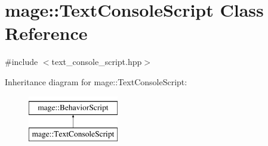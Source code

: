 \hypertarget{classmage_1_1_text_console_script}{}\section{mage\+:\+:Text\+Console\+Script Class Reference}
\label{classmage_1_1_text_console_script}


{\ttfamily \#include $<$text\+\_\+console\+\_\+script.\+hpp$>$}

Inheritance diagram for mage\+:\+:Text\+Console\+Script\+:\begin{figure}[H]
\begin{center}
\leavevmode
\includegraphics[height=2.000000cm]{classmage_1_1_text_console_script}
\end{center}
\end{figure}

